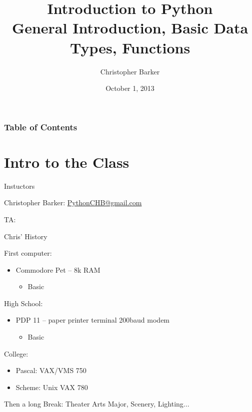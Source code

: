 \documentclass{beamer}
\title[Intro to Python: Week 1]{Introduction  to Python\\ General Introduction, Basic Data Types, Functions}
\author{Christopher Barker}
\institute{UW Continuing Education}
\date{October 1, 2013}
\begin{document}
\begin{frame}
\titlepage
\end{frame}

\begin{frame}
\frametitle{Table of Contents}
\tableofcontents
\end{frame}

\section{Intro to the Class}

\begin{frame}{Instuctors}

Christopher Barker: \url{PythonCHB@gmail.com}

\vspace{0.5 in}

TA: 

\end{frame}


\begin{frame}{Chris' History}

{\Large First computer:}
\begin{itemize}
  \item Commodore Pet -- 8k RAM
  \begin{itemize}
    \item  Basic
  \end{itemize}
\end{itemize}


{\Large High School:}
\begin{itemize}
  \item PDP 11 -- paper printer terminal 200baud modem 
  \begin{itemize}
    \item  Basic
  \end{itemize}
\end{itemize}

\pause

{\Large College: }
\begin{itemize}
  \item Pascal:  VAX/VMS  750 
  \item Scheme:  Unix VAX 780
\end{itemize}

\vspace{0.25in}

\pause

Then a long Break: Theater Arts Major, Scenery, Lighting...

\end{frame}
\end{document}
